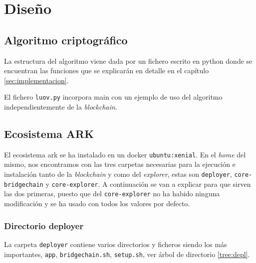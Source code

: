 \chapter{Diseño}
\label{sec:diseno}



\section{Algoritmo criptográfico}

La estructura del algoritmo viene dada por un fichero escrito en python donde se encuentran las funciones que se explicarán en detalle en el capítulo \ref{sec:implementacion}.

El fichero \texttt{luov.py} incorpora main con un ejemplo de uso del algoritmo independientemente de la \textit{blockchain}.

\section{Ecosistema ARK}

El ecosistema ark se ha instalado en un docker \texttt{ubuntu:xenial}. En el \textit{home} del mismo, nos encontramos con las tres carpetas necesarias para la ejecución e instalación tanto de la \textit{blockchain} y como del \textit{explorer}, estas son \texttt{deployer}, \texttt{core-bridgechain} y \texttt{core-explorer}. A continuación se van a explicar para que sirven las dos primeras, puesto que del \texttt{core-explorer} no ha habido ninguna modificación y se ha usado con todos los valores por defecto.

\subsection{Directorio deployer}
La carpeta \texttt{deployer} contiene varios directorios y ficheros siendo los más importantes, \texttt{app}, \texttt{bridgechain.sh}, \texttt{setup.sh}, ver árbol de directorio \ref{tree:depl}.


